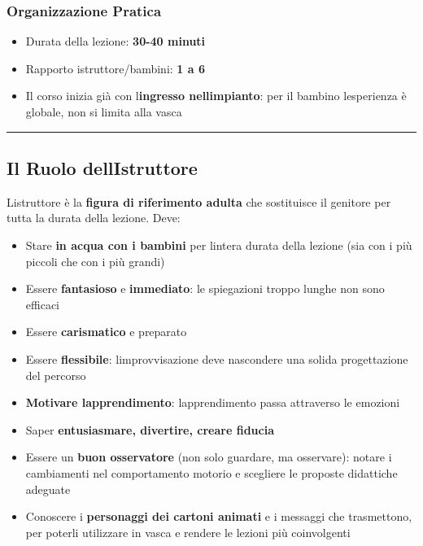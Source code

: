 \documentclass[a4paper,11pt]{article}
\providecommand{\tightlist}{%
  \setlength{\itemsep}{0pt}\setlength{\parskip}{0pt}}
\begin{document}
\subsubsection{Organizzazione Pratica}\label{organizzazione-pratica}

\begin{itemize}
      \tightlist
      \item
            Durata della lezione: \textbf{30-40 minuti}
      \item
            Rapporto istruttore/bambini: \textbf{1 a 6}
      \item
            Il corso inizia già con l\textquotesingle{}\textbf{ingresso
                  nell\textquotesingle impianto}: per il bambino
            l\textquotesingle esperienza è globale, non si limita alla vasca
\end{itemize}

\begin{center}\rule{0.5\linewidth}{0.5pt}\end{center}

\subsection{Il Ruolo
      dell\textquotesingle Istruttore}\label{il-ruolo-dellistruttore-1}

L\textquotesingle istruttore è la \textbf{figura di riferimento adulta}
che sostituisce il genitore per tutta la durata della lezione. Deve:

\begin{itemize}
      \tightlist
      \item
            Stare \textbf{in acqua con i bambini} per l\textquotesingle intera
            durata della lezione (sia con i più piccoli che con i più grandi)
      \item
            Essere \textbf{fantasioso} e \textbf{immediato}: le spiegazioni troppo
            lunghe non sono efficaci
      \item
            Essere \textbf{carismatico} e preparato
      \item
            Essere \textbf{flessibile}: l\textquotesingle improvvisazione deve
            nascondere una solida progettazione del percorso
      \item
            \textbf{Motivare l\textquotesingle apprendimento}:
            l\textquotesingle apprendimento passa attraverso le emozioni
      \item
            Saper \textbf{entusiasmare, divertire, creare fiducia}
      \item
            Essere un \textbf{buon osservatore} (non solo guardare, ma osservare):
            notare i cambiamenti nel comportamento motorio e scegliere le proposte
            didattiche adeguate
      \item
            Conoscere i \textbf{personaggi dei cartoni animati} e i messaggi che
            trasmettono, per poterli utilizzare in vasca e rendere le lezioni più
            coinvolgenti
\end{itemize}
\end{document}
